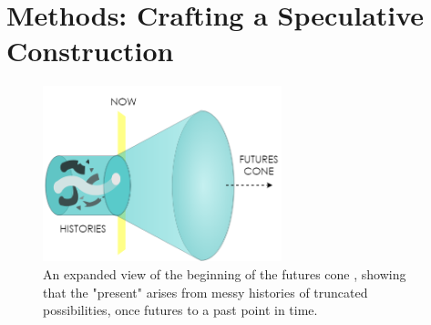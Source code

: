 
\section{Methods: Crafting a Speculative Construction}

\begin{figure}
  \centering
  \includegraphics[height=2in]{figs/EST_Future Cone.png}
  \caption[Illustration combining the ``futures cone'' from speculative design with design justice's acknowledgement of historical violence.]{An expanded view of the beginning of the futures cone \cite{dunne_speculative_2013}, showing that the "present" arises from messy histories of truncated possibilities, once futures to a past point in time.}
  \label{fig:justice-futures-cone}
\end{figure}

